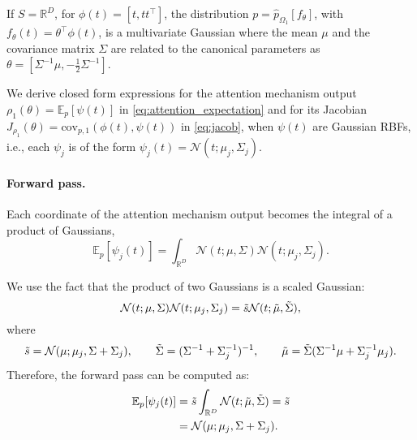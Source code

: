 \documentclass{article}
\begin{document}
If $S=\mathbb{R}^D$, for $\phi(t)=[t,tt^\top]$, the distribution $p=\hat{p}_{\Omega_1}[f_\theta]$, with $f_\theta(t)=\theta^\top \phi(t)$, is a multivariate Gaussian where the mean $\mu$ and the covariance matrix $\Sigma$ are related to the canonical parameters as $\theta=[\Sigma^{-1}\mu,-\frac{1}{2}\Sigma^{-1}]$. 

We derive closed form expressions for the attention mechanism output 
$\rho_1(\theta)=\mathbb{E}_p[\psi(t)]$ in \eqref{eq:attention_expectation} and for its Jacobian $J_{\rho_1}(\theta)= \mathrm{cov}_{p,1}(\phi(t), \psi(t))$ in \eqref{eq:jacob},  when $\psi(t)$ are Gaussian RBFs, i.e., each $\psi_j$ is of the form $\psi_j(t)=\mathcal{N}(t;\mu_j, \Sigma_j)$. 

\paragraph{Forward pass.}

Each coordinate of the attention mechanism output becomes the integral of a product of Gaussians,
\begin{equation}
    \mathbb{E}_p[\psi_j(t)]=\int_{\mathbb{R}^D}\mathcal{N}(t;\mu, \Sigma)\mathcal{N}(t;\mu_j, \Sigma_j).
\end{equation}

We use the fact that the product of two Gaussians is a scaled Gaussian:
\begin{equation}
    \mathcal{N}(t;\mu, \Sigma)\mathcal{N}(t;\mu_j, \Sigma_j)=\Tilde{s}\mathcal{N}(t;\Tilde{\mu}, \Tilde{\Sigma}),
\end{equation}
where 
\begin{equation}
    \Tilde{s}=\mathcal{N}(\mu;\mu_j, \Sigma + \Sigma_j), \qquad \Tilde{\Sigma}=(\Sigma^{-1}+\Sigma_j^{-1})^{-1}, \qquad \Tilde{\mu}=\Tilde{\Sigma}(\Sigma^{-1}\mu+\Sigma_j^{-1}\mu_j).
\end{equation}
Therefore, the forward pass can be computed as:
\begin{equation}\label{eq:continuous_softmax_forward_pass}
\begin{split}
\mathbb{E}_p[\psi_j(t)] & =\Tilde{s}\int_{\mathbb{R}^D}\mathcal{N}(t;\Tilde{\mu}, \Tilde{\Sigma})=\Tilde{s}\\
 & =\mathcal{N}(\mu;\mu_j, \Sigma + \Sigma_j).
\end{split}
\end{equation}
\end{document}
